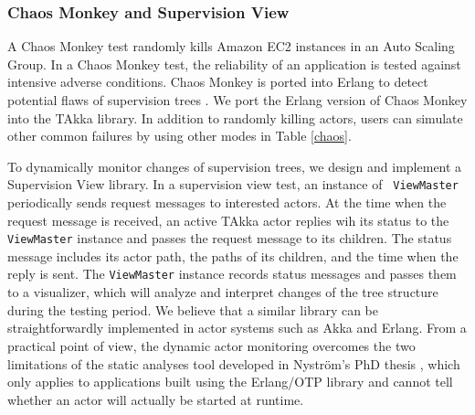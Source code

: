 \subsubsection {Chaos Monkey and Supervision View}

A Chaos Monkey test \citep{ChaosMonkey} randomly kills Amazon EC2 instances in 
an Auto Scaling Group.  In a Chaos Monkey test, the 
reliability of an application is tested against intensive adverse 
conditions.  Chaos Monkey is ported into Erlang to detect potential flaws of 
supervision trees \citep{ErlangChaosMonkey}.  We port the Erlang version of 
Chaos 
Monkey into the TAkka library.  In addition to randomly killing actors, users 
can simulate other common failures by using other modes in Table \ref{chaos}.


To dynamically monitor changes of supervision trees, we design and implement 
a Supervision View library. In a supervision view test, an instance of {\tt 
ViewMaster} periodically sends request messages to interested actors.  At the 
time when the request message is received, an active TAkka actor replies wih 
its status to the {\tt ViewMaster} instance and passes the request message to 
its children.  The status message includes its actor path, the paths of its 
children, and the time when the reply is sent.  The {\tt ViewMaster} instance 
records status messages and passes them to a visualizer, which will analyze 
and 
interpret changes of the tree structure during the testing period.  We believe 
that a similar library can be straightforwardly implemented in actor systems such 
as Akka and Erlang.  From a practical point of view, the dynamic actor 
monitoring overcomes the two limitations of the static analyses tool 
developed in Nyström's PhD thesis \citep{JanHenry}, which only applies to 
applications built using the Erlang/OTP library and cannot tell whether 
an actor will actually be started at runtime.



